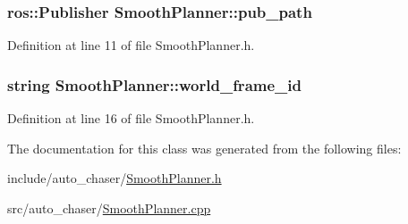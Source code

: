\subsubsection[{\texorpdfstring{pub\+\_\+path}{pub_path}}]{\setlength{\rightskip}{0pt plus 5cm}ros\+::\+Publisher Smooth\+Planner\+::pub\+\_\+path}\hypertarget{class_smooth_planner_a7b8400f711456291e567d0fc204c274b}{}\label{class_smooth_planner_a7b8400f711456291e567d0fc204c274b}


Definition at line 11 of file Smooth\+Planner.\+h.

\subsubsection[{\texorpdfstring{world\+\_\+frame\+\_\+id}{world_frame_id}}]{\setlength{\rightskip}{0pt plus 5cm}string Smooth\+Planner\+::world\+\_\+frame\+\_\+id}\hypertarget{class_smooth_planner_ade278c4209b962d8342a2ee30e718c8b}{}\label{class_smooth_planner_ade278c4209b962d8342a2ee30e718c8b}


Definition at line 16 of file Smooth\+Planner.\+h.



The documentation for this class was generated from the following files\+:\begin{DoxyCompactItemize}
\item 
include/auto\+\_\+chaser/\hyperlink{_smooth_planner_8h}{Smooth\+Planner.\+h}\item 
src/auto\+\_\+chaser/\hyperlink{_smooth_planner_8cpp}{Smooth\+Planner.\+cpp}\end{DoxyCompactItemize}
